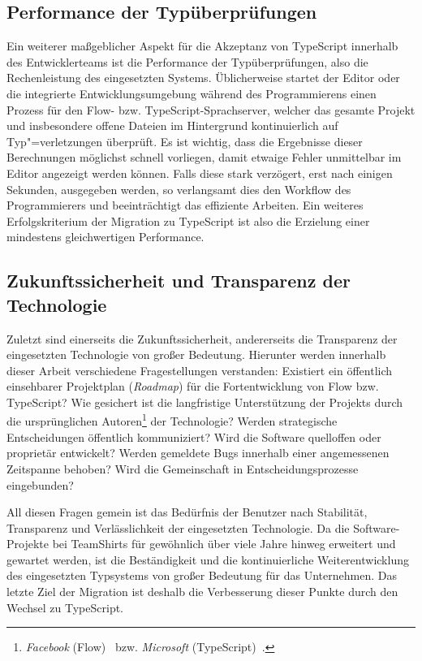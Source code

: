 \subsection{Performance der Typüberprüfungen}

Ein weiterer maßgeblicher Aspekt für die Akzeptanz von TypeScript innerhalb des Entwicklerteams ist die Performance der Typüberprüfungen, also die Rechenleistung des eingesetzten Systems. Üblicherweise startet der Editor oder die integrierte Entwicklungsumgebung während des Programmierens einen Prozess für den Flow- bzw. TypeScript-Sprachserver, welcher das gesamte Projekt und insbesondere offene Dateien im Hintergrund kontinuierlich auf Typ"=verletzungen überprüft. Es ist wichtig, dass die Ergebnisse dieser Berechnungen möglichst schnell vorliegen, damit etwaige Fehler unmittelbar im Editor angezeigt werden können. Falls diese stark verzögert, erst nach einigen Sekunden, ausgegeben werden, so verlangsamt dies den Workflow des Programmierers und beeinträchtigt das effiziente Arbeiten. Ein weiteres Erfolgskriterium der Migration zu TypeScript ist also die Erzielung einer mindestens gleichwertigen Performance.

\subsection{Zukunftssicherheit und Transparenz der Technologie}

Zuletzt sind einerseits die Zukunftssicherheit, andererseits die Transparenz der eingesetzten Technologie von großer Bedeutung. Hierunter werden innerhalb dieser Arbeit verschiedene Fragestellungen verstanden: Existiert ein öffentlich einsehbarer Projektplan (\textit{Roadmap}) für die Fortentwicklung von Flow bzw. TypeScript? Wie gesichert ist die langfristige Unterstützung der Projekts durch die ursprünglichen Autoren\footnote{\textit{Facebook} (Flow)~\autocite{FLOW:PAPER} bzw. \emph{Microsoft} (TypeScript)~\autocite{TYPESCRIPT:SPEC}.} der Technologie? Werden strategische Entscheidungen öffentlich kommuniziert? Wird die Software quelloffen oder proprietär entwickelt? Werden gemeldete Bugs innerhalb einer angemessenen Zeitspanne behoben? Wird die Gemeinschaft in Entscheidungsprozesse eingebunden?

All diesen Fragen gemein ist das Bedürfnis der Benutzer nach Stabilität, Transparenz und Verlässlichkeit der eingesetzten Technologie. Da die Software-Projekte bei TeamShirts für gewöhnlich über viele Jahre hinweg erweitert und gewartet werden, ist die Beständigkeit und die kontinuierliche Weiterentwicklung des eingesetzten Typsystems von großer Bedeutung für das Unternehmen. Das letzte Ziel der Migration ist deshalb die Verbesserung dieser Punkte durch den Wechsel zu TypeScript.

